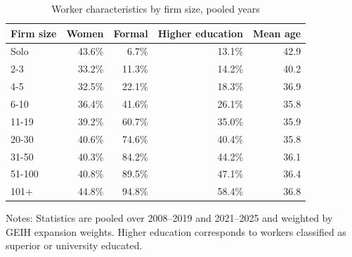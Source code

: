 \begin{table}[htbp]
  \centering
  \caption{Worker characteristics by firm size, pooled years}
  \label{tab:descriptive-worker-characteristics}
  \small
  \begin{tabular}{lrrrr}
    \toprule
    Firm size & Women & Formal & Higher education & Mean age \\
    \midrule
    Solo & 43.6\% & 6.7\% & 13.1\% & 42.9 \\
    2-3 & 33.2\% & 11.3\% & 14.2\% & 40.2 \\
    4-5 & 32.5\% & 22.1\% & 18.3\% & 36.9 \\
    6-10 & 36.4\% & 41.6\% & 26.1\% & 35.8 \\
    11-19 & 39.2\% & 60.7\% & 35.0\% & 35.9 \\
    20-30 & 40.6\% & 74.6\% & 40.4\% & 35.8 \\
    31-50 & 40.3\% & 84.2\% & 44.2\% & 36.1 \\
    51-100 & 40.8\% & 89.5\% & 47.1\% & 36.4 \\
    101+ & 44.8\% & 94.8\% & 58.4\% & 36.8 \\
    \bottomrule
  \end{tabular}
  \vspace{0.3em}
  \begin{minipage}{0.95\textwidth}
  \footnotesize
  Notes: Statistics are pooled over 2008--2019 and 2021--2025 and weighted by GEIH expansion weights. Higher education corresponds to workers classified as superior or university educated.
  \end{minipage}
\end{table}
